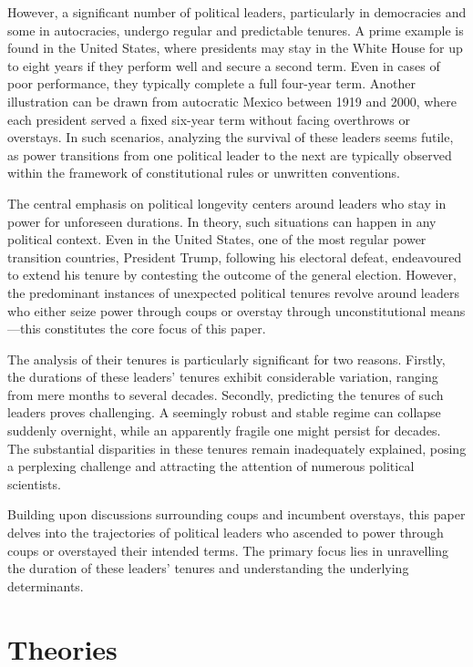 \documentclass[
  12pt,
  a4paper,
  DIV=11,
  numbers=noendperiod]{scrartcl}
\begin{document}
However, a significant number of political leaders, particularly in
democracies and some in autocracies, undergo regular and predictable
tenures. A prime example is found in the United States, where presidents
may stay in the White House for up to eight years if they perform well
and secure a second term. Even in cases of poor performance, they
typically complete a full four-year term. Another illustration can be
drawn from autocratic Mexico between 1919 and 2000, where each president
served a fixed six-year term without facing overthrows or overstays. In
such scenarios, analyzing the survival of these leaders seems futile, as
power transitions from one political leader to the next are typically
observed within the framework of constitutional rules or unwritten
conventions.

The central emphasis on political longevity centers around leaders who
stay in power for unforeseen durations. In theory, such situations can
happen in any political context. Even in the United States, one of the
most regular power transition countries, President Trump, following his
electoral defeat, endeavoured to extend his tenure by contesting the
outcome of the general election. However, the predominant instances of
unexpected political tenures revolve around leaders who either seize
power through coups or overstay through unconstitutional means---this
constitutes the core focus of this paper.

The analysis of their tenures is particularly significant for two
reasons. Firstly, the durations of these leaders' tenures exhibit
considerable variation, ranging from mere months to several decades.
Secondly, predicting the tenures of such leaders proves challenging. A
seemingly robust and stable regime can collapse suddenly overnight,
while an apparently fragile one might persist for decades. The
substantial disparities in these tenures remain inadequately explained,
posing a perplexing challenge and attracting the attention of numerous
political scientists.

Building upon discussions surrounding coups and incumbent overstays,
this paper delves into the trajectories of political leaders who
ascended to power through coups or overstayed their intended terms. The
primary focus lies in unravelling the duration of these leaders' tenures
and understanding the underlying determinants.

\hypertarget{theories}{%
\section{Theories}\label{theories}}
\end{document}
